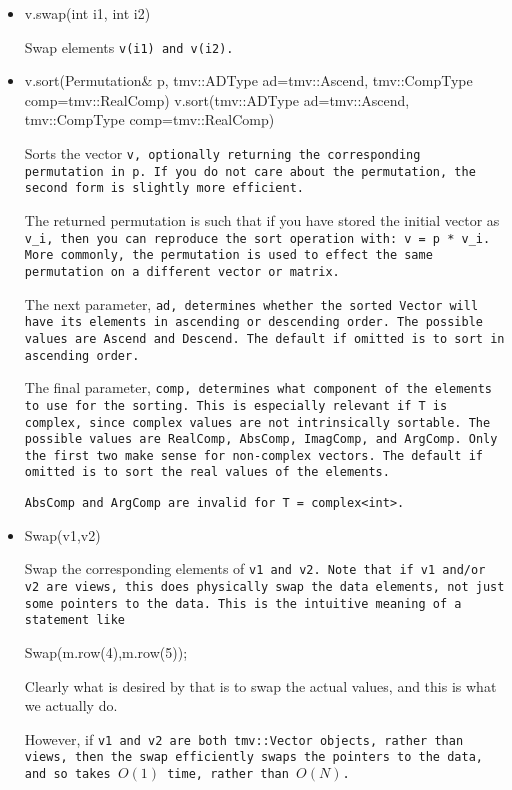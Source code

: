\begin{itemize}
\item
\begin{tmvcode}
v.swap(int i1, int i2)
\end{tmvcode}
Swap elements \tt{v(i1)} and \tt{v(i2)}.

\item
\begin{tmvcode}
v.sort(Permutation& p, tmv::ADType ad=tmv::Ascend, 
      tmv::CompType comp=tmv::RealComp)
v.sort(tmv::ADType ad=tmv::Ascend, 
      tmv::CompType comp=tmv::RealComp)
\end{tmvcode}
Sorts the vector \tt{v}, optionally returning the corresponding permutation in \tt{p}.
If you do not care about the permutation, the second form is slightly more efficient.

The returned permutation is such that if you have stored the initial vector as
\tt{v\_i}, then you can reproduce the sort operation with: \tt{v = p * v\_i}.
More commonly, the permutation is used to effect the same permutation on a 
different vector or matrix.

The next parameter, \tt{ad}, determines whether the sorted \tt{Vector} 
will have its elements in ascending or descending order.  The possible values
are \tt{Ascend} and \tt{Descend}.  The default if omitted is to sort
in ascending order.

The final parameter, \tt{comp}, determines what component of the
elements to use for the sorting.  This is especially relevant if T is complex, 
since complex values are not intrinsically sortable.
The possible values are
\tt{RealComp}, \tt{AbsComp},
\tt{ImagComp}, and \tt{ArgComp}.
Only the first two make sense for non-complex vectors.  The default if
omitted is to sort the real values of the elements.  

\tt{AbsComp} and \tt{ArgComp} are invalid for \tt{T = complex<int>}.

\item
\begin{tmvcode}
Swap(v1,v2)
\end{tmvcode}
Swap the corresponding elements of \tt{v1} and \tt{v2}.  Note that if v1 and/or v2 are
views, this does physically
swap the data elements, not just some pointers to the data.  This is the intuitive 
meaning of a statement like
\begin{tmvcode}
Swap(m.row(4),m.row(5));
\end{tmvcode}
Clearly what is desired by that is to swap the actual values, and this is what we actually do.

However, if \tt{v1} and \tt{v2} are both \tt{tmv::Vector} objects, rather than views, then the 
swap efficiently swaps the pointers to the data, and so takes $O(1)$ time, rather than
$O(N)$.

\end{itemize}

